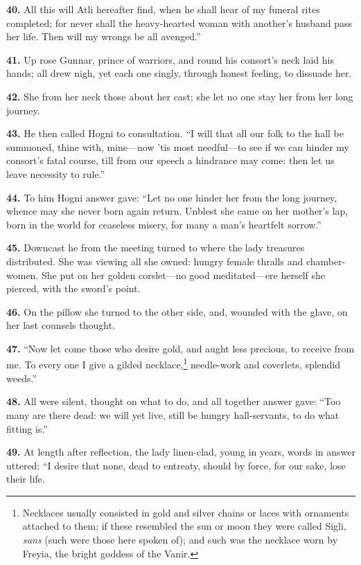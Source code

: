\textbf{40.} All this will Atli hereafter find, when he shall hear of my
funeral rites completed; for never shall the heavy-hearted woman with
another's husband pass her life. Then will my wrongs be all avenged.''

\textbf{41.} Up rose Gunnar, prince of warriors, and round his consort's neck
laid his hands; all drew nigh, yet each one singly, through honest
feeling, to dissuade her.

\textbf{42.} She from her neck those about her cast; she let no one stay her
from her long journey.

\textbf{43.} He then called Hogni to consultation. ``I will that all our folk
to the hall be summoned, thine with, mine—now 'tis most needful—to
see if we can hinder my consort's fatal course, till from our speech a
hindrance may come: then let us leave necessity to rule.''

\textbf{44.} To him Hogni answer gave: ``Let no one hinder her from the long
journey, whence may she never born again return. Unblest she came on
her mother's lap, born in the world for ceaseless misery, for many a
man's heartfelt sorrow.''

\textbf{45.} Downcast he from the meeting turned to where the lady treasures
distributed. She was viewing all she owned: hungry female thralls and
chamber-women. She put on her golden corslet—no good meditated—ere
herself she pierced, with the sword's point.

\textbf{46.} On the pillow she turned to the other side, and, wounded with
the glave, on her last counsels thought.

\textbf{47.} ``Now let come those who desire gold, and aught less precious, to
receive from me. To every one I give a gilded necklace,\footnote{Necklaces usually consisted in gold and silver chains or
laces with ornaments attached to them; if these resembled the sun or
moon they were called Sigli, \emph{suns} (such were those here spoken of);
and such was the necklace worn by Freyia, the bright goddess of the
Vanir.}
needle-work and coverlets, splendid weeds.''

\textbf{48.} All were silent, thought on what to do, and all together answer
gave: ``Too many are there dead: we will yet live, still be hungry
hall-servants, to do what fitting is.''

\textbf{49.} At length after reflection, the lady linen-clad, young in years,
words in answer uttered: ``I desire that none, dead to entreaty, should
by force, for our sake, lose their life.

